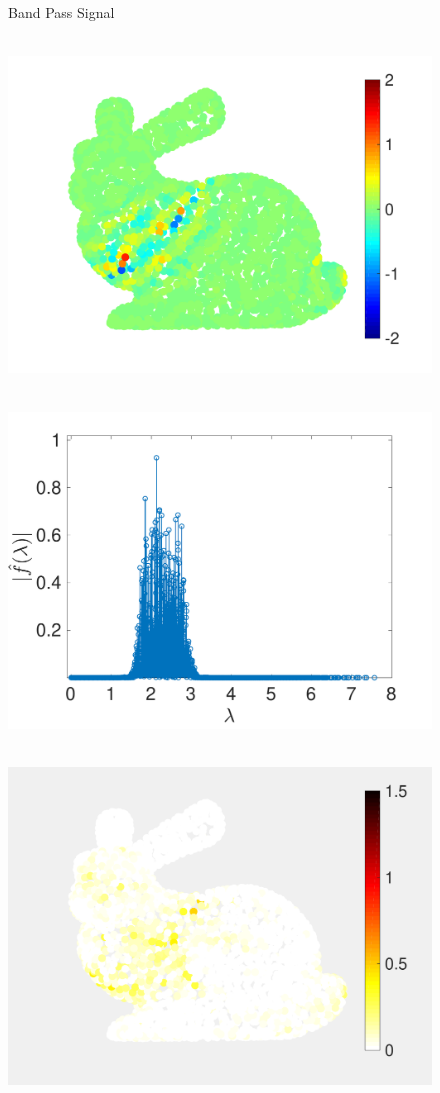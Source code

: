 \documentclass[a4paper]{article}
\theoremstyle{definition}
\begin{document}
\begin{figure}[bth]
\begin{minipage}[m]{0.16\linewidth}
\end{minipage}\\
\begin{minipage}[m]{0.16\linewidth}
\centerline{\small{Band Pass Signal}}
\end{minipage}
\begin{minipage}[m]{0.16\linewidth}
\centerline{~~\includegraphics[width=.85\linewidth]{fig_band_pass_signal_bunny}}
\end{minipage}
\begin{minipage}[m]{0.16\linewidth}
\centerline{~~\includegraphics[width=.85\linewidth]{fig_band_pass_signal_spectral_bunny}}
\end{minipage}
\begin{minipage}[m]{0.16\linewidth}
\centerline{~~\includegraphics[width=.85\linewidth]{fig_spline_filter_error_band_pass_bunny}}

\end{minipage}
\end{figure}
\end{document}
